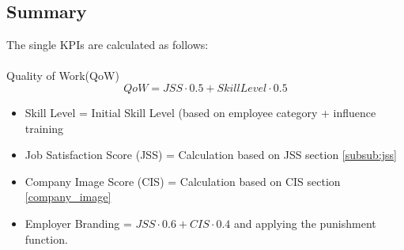 \subsection{Summary}

The single KPIs are calculated as follows:\\\\

Quality of Work(\gls{QoW})
\begin{equation}
     QoW = JSS \cdot 0.5 + SkillLevel \cdot 0.5   
     \label{QoW}
\end{equation}

\begin{itemize}
\item Skill Level = Initial Skill Level (based on employee category + influence training
\item Job Satisfaction Score (JSS) = Calculation based on JSS section \ref{subsub:jss}
\item Company Image Score (CIS) = Calculation based on CIS section \ref{company_image}
\item Employer Branding = $JSS \cdot 0.6 + CIS \cdot 0.4$ and applying the punishment function. 
\end{itemize}